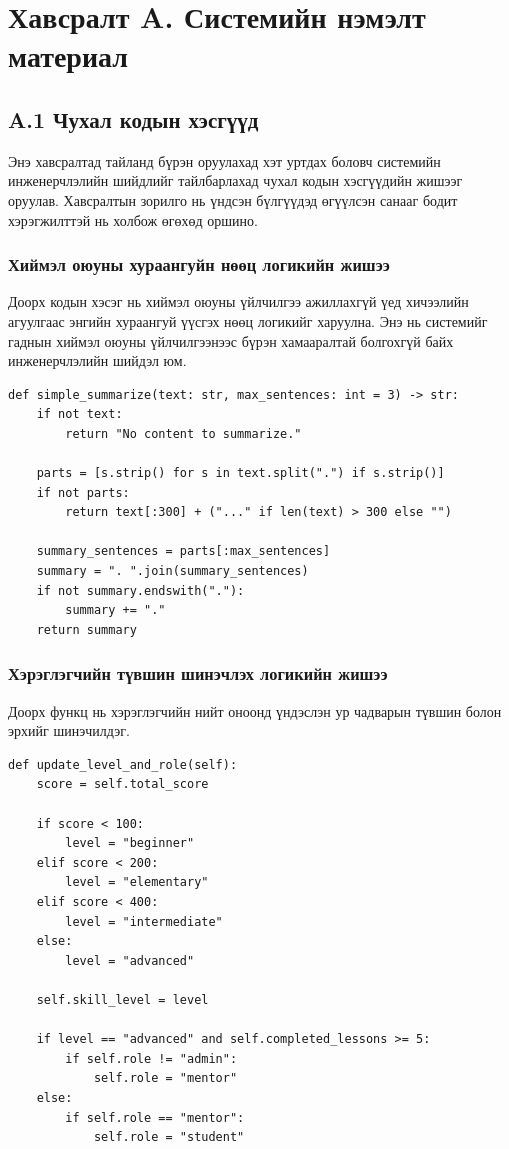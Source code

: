 
\label{AppendixA}
\chapter*{Хавсралт A. Системийн нэмэлт материал}

\section*{A.1 Чухал кодын хэсгүүд}
Энэ хавсралтад тайланд бүрэн оруулахад хэт уртдах боловч системийн инженерчлэлийн шийдлийг тайлбарлахад чухал кодын хэсгүүдийн жишээг оруулав. Хавсралтын зорилго нь үндсэн бүлгүүдэд өгүүлсэн санааг бодит хэрэгжилттэй нь холбож өгөхөд оршино.

\subsection*{Хиймэл оюуны хураангуйн нөөц логикийн жишээ}
Доорх кодын хэсэг нь хиймэл оюуны үйлчилгээ ажиллахгүй үед хичээлийн агуулгаас энгийн хураангуй үүсгэх нөөц логикийг харуулна. Энэ нь системийг гаднын хиймэл оюуны үйлчилгээнээс бүрэн хамааралтай болгохгүй байх инженерчлэлийн шийдэл юм.

\begin{lstlisting}
def simple_summarize(text: str, max_sentences: int = 3) -> str:
    if not text:
        return "No content to summarize."

    parts = [s.strip() for s in text.split(".") if s.strip()]
    if not parts:
        return text[:300] + ("..." if len(text) > 300 else "")

    summary_sentences = parts[:max_sentences]
    summary = ". ".join(summary_sentences)
    if not summary.endswith("."):
        summary += "."
    return summary
\end{lstlisting}

\subsection*{Хэрэглэгчийн түвшин шинэчлэх логикийн жишээ}
Доорх функц нь хэрэглэгчийн нийт оноонд үндэслэн ур чадварын түвшин болон эрхийг шинэчилдэг.

\begin{lstlisting}
def update_level_and_role(self):
    score = self.total_score

    if score < 100:
        level = "beginner"
    elif score < 200:
        level = "elementary"
    elif score < 400:
        level = "intermediate"
    else:
        level = "advanced"

    self.skill_level = level

    if level == "advanced" and self.completed_lessons >= 5:
        if self.role != "admin":
            self.role = "mentor"
    else:
        if self.role == "mentor":
            self.role = "student"
\end{lstlisting}

